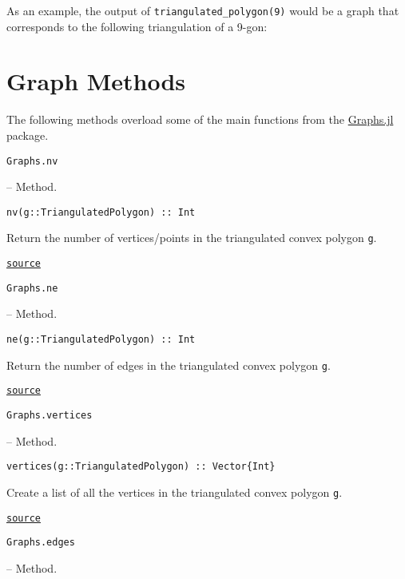 As an example, the output of \texttt{triangulated\_polygon(9)} would be a graph that corresponds to the following triangulation of a 9-gon:





\section{Graph Methods}



\label{11321063701219043265}{}


The following methods overload some of the main functions from the \href{https://juliagraphs.org/Graphs.jl/stable/}{Graphs.jl} package.


\hypertarget{8167533972265480819}{\texttt{Graphs.nv}}  -- {Method.}

\begin{adjustwidth}{2em}{0pt}


\begin{verbatim}
nv(g::TriangulatedPolygon) :: Int
\end{verbatim}

Return the number of vertices/points in the triangulated convex polygon \texttt{g}.



\href{https://github.com/schto223/FlipGraphs.jl/blob/490c01a7adf74b42f27dda05099165c47ae8133e/src/polygonTriangulations.jl#L111-L115}{\texttt{source}}


\end{adjustwidth}
\hypertarget{4124488593235871915}{\texttt{Graphs.ne}}  -- {Method.}

\begin{adjustwidth}{2em}{0pt}


\begin{verbatim}
ne(g::TriangulatedPolygon) :: Int
\end{verbatim}

Return the number of edges in the triangulated convex polygon \texttt{g}.



\href{https://github.com/schto223/FlipGraphs.jl/blob/490c01a7adf74b42f27dda05099165c47ae8133e/src/polygonTriangulations.jl#L104-L108}{\texttt{source}}


\end{adjustwidth}
\hypertarget{2409708083507170643}{\texttt{Graphs.vertices}}  -- {Method.}

\begin{adjustwidth}{2em}{0pt}


\begin{verbatim}
vertices(g::TriangulatedPolygon) :: Vector{Int}
\end{verbatim}

Create a list of all the vertices in the triangulated convex polygon \texttt{g}.



\href{https://github.com/schto223/FlipGraphs.jl/blob/490c01a7adf74b42f27dda05099165c47ae8133e/src/polygonTriangulations.jl#L118-L122}{\texttt{source}}


\end{adjustwidth}
\hypertarget{15968138045719588877}{\texttt{Graphs.edges}}  -- {Method.}

